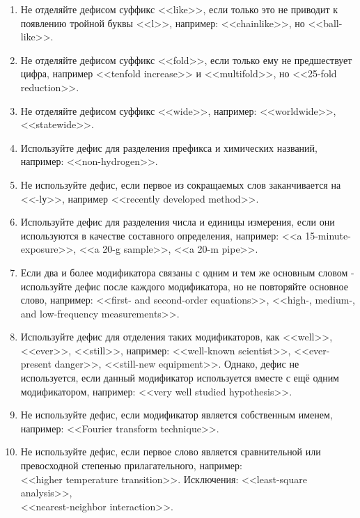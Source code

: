 \documentclass[a5paper, 10pt, twoside, numbers=enddot]{scrartcl}
\begin{document}
\begin{enumerate}
\begin{enumerate}
    \item Не отделяйте дефисом суффикс <<like>>, если только это не приводит к появлению тройной буквы <<l>>, например: <<chainlike>>, но <<ball-like>>.
    
    \item Не отделяйте дефисом суффикс <<fold>>, если только ему не предшествует цифра, например <<tenfold increase>> и <<multifold>>, но <<25-fold reduction>>.
    
    \item Не отделяйте дефисом суффикс <<wide>>, например: <<worldwide>>,\\ <<statewide>>.
    
    \item Используйте дефис для разделения префикса и химических названий, например: <<non-hydrogen>>.
    
    \item Не используйте дефис, если первое из сокращаемых слов заканчивается на <<-lу>>, например <<recently developed method>>.
    
    \item Используйте дефис для разделения числа и единицы измерения, если они используются в качестве составного определения, например: <<a 15-minute-exposure>>, <<a 20-g sample>>, <<a 20-m pipe>>.

    \item Если два и более модификатора связаны с одним и тем же основным словом - используйте дефис после каждого модификатора, но не повторяйте основное слово, например: <<first- and second-order equations>>, <<high-, medium-, and low-frequency measurements>>.

    \item Используйте дефис для отделения таких модификаторов, как <<well>>, <<ever>>, <<still>>, например: <<well-known scientist>>, <<ever-present danger>>, <<still-new equipment>>. Однако, дефис не используется, если данный модификатор  используется вместе с ещё одним модификатором, например: <<very well studied hypothesis>>.

    \item Не используйте дефис, если модификатор является собственным именем, например: <<Fourier transform technique>>.

    \item Не используйте дефис, если первое слово является сравнительной или превосходной степенью прилагательного, например:\\ <<higher temperature transition>>. Исключения: <<least-square analysis>>,\\ <<nearest-neighbor interaction>>.


\end{enumerate}
\end{enumerate}
\end{document}
